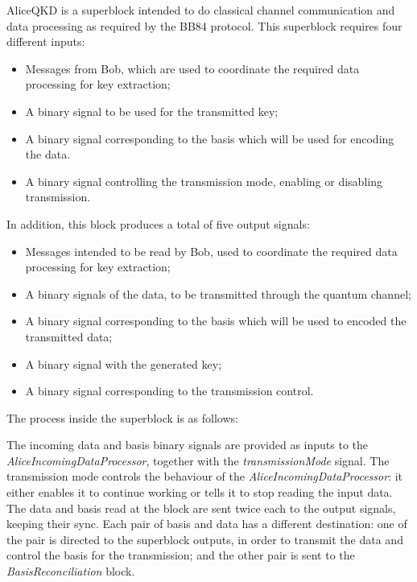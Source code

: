AliceQKD is a superblock intended to do classical channel communication and 
data processing  as required by the BB84 protocol. This superblock requires 
four different inputs:

\begin{itemize}
	\item Messages from Bob, which are used to coordinate the required data 
	processing for key extraction;
	\item A binary signal to be used for the transmitted key;
	\item A binary signal corresponding to the basis which will be used for 
	encoding the data.
	\item A binary signal controlling the transmission mode, enabling or 
	disabling transmission.
\end{itemize}

In addition, this block produces a total of five output signals:

\begin{itemize}
	\item	Messages intended to be read by Bob, used to coordinate the required 
	data processing for key extraction;
	\item A binary signals of the data, to be transmitted through the quantum 
	channel;
	\item A binary signal corresponding to the basis which will be used to 
	encoded the transmitted data;
	\item A binary signal with the generated key;
	\item A binary signal corresponding to the transmission control.
\end{itemize}


The process inside the superblock is as follows:

The incoming data and basis binary signals are provided as inputs to the 
\textit{AliceIncomingDataProcessor}, together with the 
\textit{transmissionMode} signal. 
The transmission mode controls the behaviour of the 
\textit{AliceIncomingDataProcessor}: it either enables it to continue working 
or tells it to stop reading the input data.
The data and basis read at the block are sent twice each to the output signals, 
keeping their sync. Each pair of basis and data has a different destination: 
one of the pair is directed to the superblock outputs, in order to transmit the 
data and control the basis for the transmission; and the other pair is sent to 
the \textit{BasisReconciliation} block.

